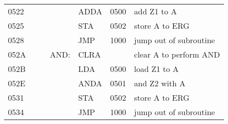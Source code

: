\documentclass{CInf_practice}
\begin{document}
\begin{tabularx}{\textwidth}{|L||L|L|L||L|R|X|}
0522 &    &      &       & ADDA & 0500 & add Z1 to A                         \\
0525 &    &      &       & STA  & 0502 & store A to ERG                      \\
0528 &    &      &       & JMP  & 1000 & jump out of subroutine              \\
052A &    &      & AND:  & CLRA &      & clear A to perform AND              \\
052B &    &      &       & LDA  & 0500 & load Z1 to A                        \\
052E &    &      &       & ANDA & 0501 & and Z2 with A                       \\
0531 &    &      &       & STA  & 0502 & store A to ERG                      \\
0534 &    &      &       & JMP  & 1000 & jump out of subroutine              \\\hline
\end{tabularx}






   \newcommand*\circled[1]{\tikz[baseline=(char.base)]{\node[font=\small,minimum
   size=3ex,left=8pt,below=8pt,shape=circle, draw,inner sep=1pt] (char) {#1};}}
\end{document}
